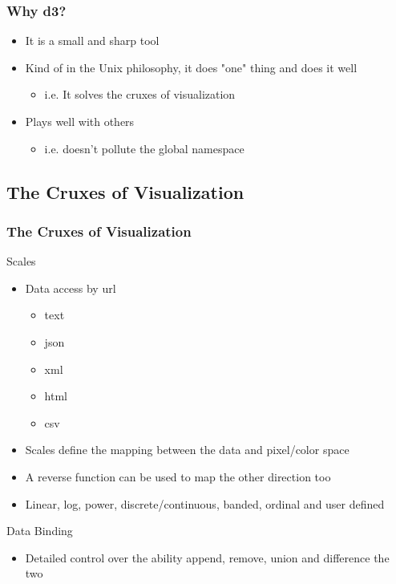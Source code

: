 \documentclass{beamer}
\begin{document}
\begin{frame}
\frametitle{Why d3?}
\begin{itemize}
\item It is a small and sharp tool 
\item Kind of in the Unix philosophy, it does "one" thing and does it well
\begin{itemize}
\item i.e. It solves the cruxes of visualization
\end{itemize}
\item Plays well with others
\begin{itemize}
\item i.e. doesn't pollute the global namespace
\end{itemize}
\end{itemize}
\end{frame}



\subsection{The Cruxes of Visualization}

\begin{frame}
\frametitle{The Cruxes of Visualization}
\begin{block}{Scales}
\begin{itemize}
\item Data access by url
\begin{itemize}
\item text
\item json
\item xml
\item html
\item csv
\end{itemize}
\item Scales define the mapping between the data and pixel/color space
\item A reverse function can be used to map the other direction too
\item Linear, log, power, discrete/continuous, banded, ordinal and user defined
\end{itemize}
\end{block}
\begin{block}{Data Binding}
\begin{itemize}
\item Detailed control over the ability append, remove, union and difference the two
\end{itemize}
\end{block}
\end{frame}
\end{document}
